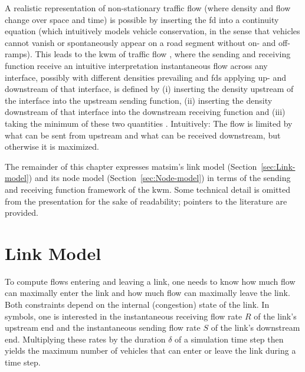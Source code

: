 A realistic representation of non-stationary traffic flow (where density
and flow change over space and time) is possible by inserting the
\gls{fd} into a continuity equation (which intuitively models vehicle conservation,
in the sense that vehicles cannot vanish or spontaneously appear on
a road segment without on- and off-ramps). This leads to the \gls{kwm} 
of traffic flow \citep[][]{lighthill-1955,richards-1956},
where the sending and receiving function receive an intuitive
interpretation instantaneous flow across any interface, possibly
with different densities prevailing and \glspl{fd} applying up- and downstream of that interface,
is defined by (i) inserting the density upstream of the interface
into the upstream sending function, (ii) inserting the density downstream
of that interface into the downstream receiving function and (iii)
taking the minimum of these two quantities \citep{Daganzo_TransResPartB_1994,lebacque-1996}.
Intuitively: The flow is limited by what can be sent from upstream
and what can be received downstream, but otherwise it is maximized.

The remainder of this chapter expresses \gls{matsim}\textquoteright{}s link
model (Section~\ref{sec:Link-model}) and its node model (Section~\ref{sec:Node-model})
in terms of the sending and receiving function framework of the \gls{kwm}.
Some technical detail is omitted from the presentation for the sake
of readability; pointers to the literature are provided.

\section{\label{sec:Link-model}Link Model}
To compute flows entering and leaving a link, one needs to know
how much flow can maximally enter the link and how much flow can 
maximally leave the link. Both constraints depend on the internal (congestion)
state of the link. In symbols, one is interested in the instantaneous
receiving flow rate $R$ of the link's upstream end and the instantaneous
sending flow rate $S$ of the link's downstream end. Multiplying these
rates by the duration $\delta$ of a simulation time step then yields
the maximum number of vehicles that can enter or leave the link
during a time step.

